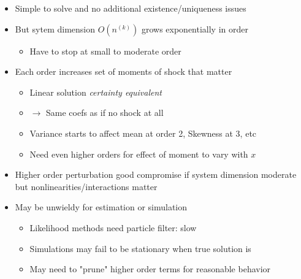 \documentclass[bigger,handout]{beamer}
\begin{document}
\begin{frame}

\begin{itemize}
\item Simple to solve and no additional existence/uniqueness issues
\item But sytem dimension $O(n^{(k)})$ grows exponentially in order
\begin{itemize}
\item Have to stop at small to moderate order
\end{itemize}
\item Each order increases set of moments of shock that matter
\begin{itemize}
\item Linear solution \emph{certainty equivalent}
\item $\to$ Same coefs as if no shock at all
\item Variance starts to affect mean at order 2, Skewness at 3, etc
\item Need even higher orders for effect of moment to vary with $x$
\end{itemize}
\item Higher order perturbation good compromise if system dimension moderate but nonlinearities/interactions matter
\item May be unwieldy for estimation or simulation
\begin{itemize}
\item Likelihood methods need particle filter: slow
\item Simulations may fail to be stationary when true solution is
\item May need to "prune" higher order terms for reasonable behavior

\end{itemize}

\end{itemize}


\end{frame}
\end{document}
